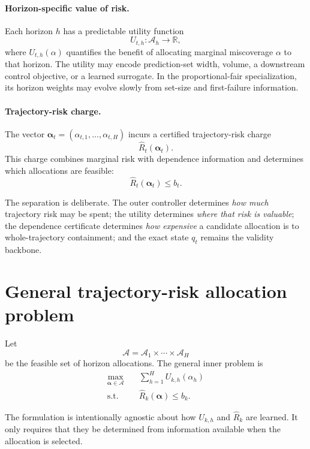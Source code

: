 \documentclass[11pt]{article}
\newcommand{\RR}{\mathbb{R}}
\newcommand{\calA}{\mathcal{A}}
\newcommand{\riskhat}{\widehat R}
\begin{document}
\paragraph{Horizon-specific value of risk.}
Each horizon $h$ has a predictable utility function
\[
    U_{t,h}:\calA_h\to\RR,
\]
where $U_{t,h}(\alpha)$ quantifies the benefit of allocating marginal
miscoverage $\alpha$ to that horizon.  The utility may encode prediction-set
width, volume, a downstream control objective, or a learned surrogate.  In the
proportional-fair specialization, its horizon weights may evolve slowly from
set-size and first-failure information.

\paragraph{Trajectory-risk charge.}
The vector $\bm\alpha_t=(\alpha_{t,1},\ldots,\alpha_{t,H})$ incurs a certified
trajectory-risk charge
\[
    \riskhat_t(\bm\alpha_t).
\]
This charge combines marginal risk with dependence information and determines
which allocations are feasible:
\[
    \riskhat_t(\bm\alpha_t)\le b_t.
\]

The separation is deliberate.  The outer controller determines \emph{how much}
trajectory risk may be spent; the utility determines \emph{where that risk is
valuable}; the dependence certificate determines \emph{how expensive} a
candidate allocation is to whole-trajectory containment; and the exact state
$q_t$ remains the validity backbone.

\section{General trajectory-risk allocation problem}
\label{sec:general}

Let
\[
    \calA=\calA_1\times\cdots\times\calA_H
\]
be the feasible set of horizon allocations. The general inner problem is
\begin{equation}
\boxed{
\begin{aligned}
    \max_{\bm\alpha\in\calA}\quad
        & \sum_{h=1}^H U_{k,h}(\alpha_h)\\
    \text{s.t.}\quad
        & \riskhat_k(\bm\alpha)\le b_k.
\end{aligned}}
\label{eq:general-allocation}
\end{equation}

The formulation is intentionally agnostic about how $U_{k,h}$ and $\riskhat_k$ are learned. It only requires that they be determined from information available when the allocation is selected.
\end{document}
